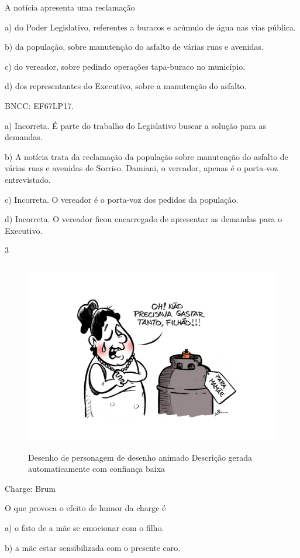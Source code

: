 A notícia apresenta uma reclamação

a) do Poder Legislativo, referentes a buracos e acúmulo de água nas vias
pública.

b) da população, sobre manutenção do asfalto de várias ruas e avenidas.

c) do vereador, sobre pedindo operações tapa-buraco no município.

d) dos representantes do Executivo, sobre a manutenção do asfalto.

BNCC: EF67LP17.

a) Incorreta. É parte do trabalho do Legislativo buscar a solução para
as demandas.

b) A notícia trata da reclamação da população sobre manutenção do
asfalto de várias ruas e avenidas de Sorriso. Damiani, o vereador,
apenas é o porta-voz entrevistado.

c) Incorreta. O vereador é o porta-voz dos pedidos da população.

d) Incorreta. O vereador ficou encarregado de apresentar as demandas
para o Executivo.

\num{3}

\begin{figure}
\centering
\includegraphics[width=4.86098in,height=3.28333in]{./imgSAEB_6_POR/media/image39.png}
\caption{Desenho de personagem de desenho animado Descrição gerada
automaticamente com confiança baixa}
\end{figure}

Charge: Brum

O que provoca o efeito de humor da charge é

a) o fato de a mãe se emocionar com o filho.

b) a mãe estar sensibilizada com o presente caro.

